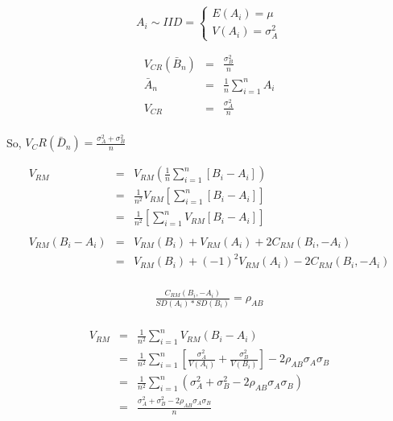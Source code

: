 \documentclass[12pt]{article}
\begin{document}
\begin{itemize}
\begin{itemize}
$$
A_i \sim IID = \left\{
        \begin{array}{ll}
           E(A_i) = \mu \\
      	   V(A_i) = \sigma_A^2 
        \end{array}
    \right.
$$

\begin{eqnarray} 
V_{CR}(\bar B_n) & = & \frac{\sigma_B^2}{n} \nonumber\\
\bar A_n & = & \frac{1}{n} \sum_{i=1}^{n} A_i \nonumber \\
V_{CR} & = & \frac{\sigma^2_A}{n} \nonumber \\ \nonumber
\end{eqnarray}

So, $V_CR (\bar D_n) = \frac{\sigma^2_A + \sigma^2_B}{n}$

\begin{eqnarray} 
V_{RM} & = & V_{RM} (\frac{1}{n} \sum_{i=1}^{n} [B_i - A_i]) \nonumber \\
& = & \frac{1}{n^2} V_{RM} [\sum_{i=1}^{n} [B_i - A_i]] \nonumber \\ 
& = & \frac{1}{n^2} [\sum_{i=1}^{n} V_{RM} [B_i - A_i]] \nonumber \\
\nonumber \\
V_{RM} (B_i - A_i) & = & V_{RM}(B_i) + V_{RM}(A_i) + 2 C_{RM} (B_i , -A_i)\nonumber \\
& = & V_{RM}(B_i) + (-1)^2 V_{RM}(A_i) - 2 C_{RM} (B_i , -A_i) \nonumber \\ \nonumber
\end{eqnarray}

\begin{eqnarray} 
\frac{C_{RM}(B_i , -A_i)}{SD(A_i) * SD(B_i)} = \rho_{AB} \nonumber \\ \nonumber
\end{eqnarray}

\begin{eqnarray} 
V_{RM} & = & \frac{1}{n^2} \sum_{i=1}^{n} V_{RM}(B_i - A_i)  \\
& = & \frac{1}{n^2} \sum_{i=1}^{n} [\frac{\sigma^2_A}{V(A_i)} + \frac{\sigma^2_B}{V(B_i)}] - 2 \rho_{AB} \sigma_A  \sigma_B \nonumber \\
& = & \frac{1}{n^2} \sum_{i=1}^{n} ( \sigma^2_A + \sigma^2_B - 2 \rho_{AB}  \sigma_A  \sigma_B) \nonumber \\
& = & \frac{\sigma^2_A + \sigma^2_B - 2 \rho_{AB}  \sigma_A  \sigma_B}{n} \nonumber \\ \nonumber 
\end{eqnarray}


\end{itemize}
\end{itemize}
\end{document}
